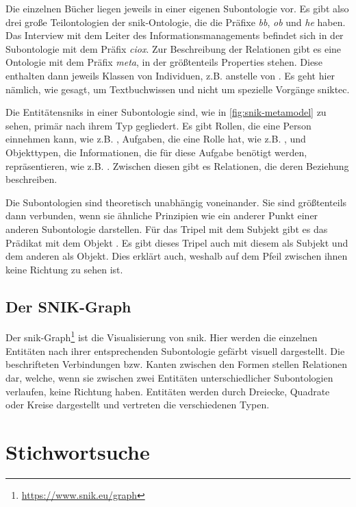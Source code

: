 Die einzelnen Bücher liegen jeweils in einer eigenen Subontologie vor.
Es gibt also drei große Teilontologien der \ac{snik}-Ontologie, die die Präfixe \emph{bb}, \emph{ob} und \emph{he} haben.
Das Interview mit dem Leiter des Informationsmanagements befindet sich in der Subontologie mit dem Präfix \emph{ciox}.
Zur Beschreibung der Relationen gibt es eine Ontologie mit dem Präfix \emph{meta}, in der größtenteils Properties stehen.
Diese enthalten dann jeweils Klassen von Individuen, z.B.  anstelle von .
Es geht hier nämlich, wie gesagt, um Textbuchwissen und nicht um spezielle Vorgänge \ac{sniktec}.

Die Entitäten\ac{snik}s in einer Subontologie sind, wie in \cref{fig:snik-metamodel} zu sehen, primär nach ihrem Typ gegliedert.
Es gibt Rollen, die eine Person einnehmen kann, wie z.B. , Aufgaben, die eine Rolle hat, wie z.B. ,
und Objekttypen, die Informationen, die für diese Aufgabe benötigt werden, repräsentieren, wie z.B. .
Zwischen diesen gibt es Relationen, die deren Beziehung beschreiben.

Die Subontologien sind theoretisch unabhängig voneinander. Sie sind größtenteils dann verbunden,
wenn sie ähnliche Prinzipien wie ein anderer Punkt einer anderen Subontologie darstellen.
Für das Tripel mit dem Subjekt  gibt es das Prädikat  mit dem Objekt .
Es gibt dieses Tripel auch mit diesem als Subjekt und dem anderen als Objekt.
Dies erklärt auch, weshalb auf dem Pfeil zwischen ihnen keine Richtung zu sehen ist.


\subsection{Der SNIK-Graph}

Der \ac{snik}-Graph\footnote{\url{https://www.snik.eu/graph}} ist die Visualisierung von \ac{snik}.
Hier werden die einzelnen Entitäten nach ihrer entsprechenden Subontologie gefärbt visuell dargestellt.
Die beschrifteten Verbindungen bzw. Kanten zwischen den Formen stellen Relationen dar,
welche, wenn sie zwischen zwei Entitäten unterschiedlicher Subontologien verlaufen, keine Richtung haben.
Entitäten werden durch Dreiecke, Quadrate oder Kreise dargestellt und vertreten die verschiedenen Typen.

\section{Stichwortsuche}


